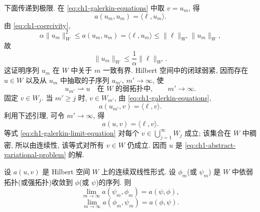 \begin{Proof}
下面传递到极限. 在 \eqref{eq:ch1-galerkin-equations} 中取 $v=u_m$, 得
\begin{equation}
a(u_m,u_m)=\langle\ell,u_m\rangle.
\label{eq:ch1-galerkin-energy-identity}
\end{equation}
由 \eqref{eq:ch1-coercivity},
\[
\alpha\lVert u_m\rVert_W^2\leq a(u_m,u_m)
=\langle\ell,u_m\rangle
\leq\lVert\ell\rVert_{W'}\lVert u_m\rVert_W,
\]
故
\begin{equation}
\lVert u_m\rVert_W\leq\frac1\alpha\lVert\ell\rVert_{W'}.
\label{eq:ch1-galerkin-uniform-bound}
\end{equation}
这证明序列 $u_m$ 在 $W$ 中关于 $m$ 一致有界. Hilbert 空间中的闭球弱紧, 因而存在 $u\in W$ 以及从 $u_m$ 中抽取的子序列 $u_{m'}$, $m'\to\infty$, 使
\begin{equation}
u_{m'}\rightharpoonup u\quad\text{在 }W\text{ 的弱拓扑中},\qquad m'\to\infty.
\label{eq:ch1-galerkin-weak-convergence}
\end{equation}
固定 $v\in W_j$. 当 $m'\geq j$ 时, $v\in W_{m'}$, 由 \eqref{eq:ch1-galerkin-equations},
\[
a(u_{m'},v)=\langle\ell,v\rangle.
\]
利用下述引理, 可令 $m'\to\infty$, 得
\begin{equation}
a(u,v)=\langle\ell,v\rangle.
\label{eq:ch1-galerkin-limit-equation}
\end{equation}
等式 \eqref{eq:ch1-galerkin-limit-equation} 对每个 $v\in\bigcup_{j=1}^{\infty}W_j$ 成立; 该集合在 $W$ 中稠密, 所以由连续性, 该等式对所有 $v\in W$ 仍成立. 因而 $u$ 是 \eqref{eq:ch1-abstract-variational-problem} 的解.
\end{Proof}

\begin{Lemma}
\label{lem:ch1-bilinear-weak-strong-limits}
设 $a(u,v)$ 是 Hilbert 空间 $W$ 上的连续双线性形式. 设 $\phi_m$(或 $\psi_m$) 是 $W$ 中依弱拓扑(或强拓扑)收敛到 $\phi$(或 $\psi$)的序列. 则
\begin{equation}
\lim_{m\to\infty}a(\psi_m,\phi_m)=a(\psi,\phi),
\label{eq:ch1-bilinear-strong-weak-limit}
\end{equation}
\begin{equation}
\lim_{m\to\infty}a(\phi_m,\psi_m)=a(\phi,\psi).
\label{eq:ch1-bilinear-weak-strong-limit}
\end{equation}
\end{Lemma}

